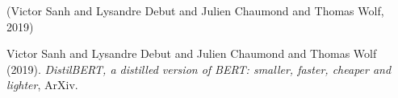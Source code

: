 \documentclass[11pt]{article}
\date{\today}
\title{}
\begin{document}
\tableofcontents

(Victor Sanh and Lysandre Debut and Julien Chaumond and Thomas Wolf, 2019)

\noindent
Victor Sanh and Lysandre Debut and Julien Chaumond and Thomas Wolf (2019). \emph{DistilBERT, a distilled version of BERT: smaller, faster, cheaper and lighter}, ArXiv.
\end{document}
